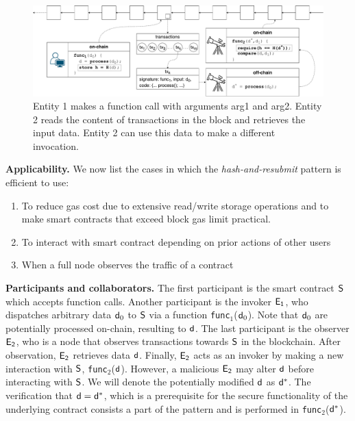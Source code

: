 \begin{figure}[h]
    \begin{center}
        \includegraphics[width=1\textwidth]{figures/observer-tx.pdf}
    \end{center}
    \caption{Entity 1 makes a function call with arguments arg1 and arg2.
    Entity 2 reads the content of transactions in the block and retrieves the
    input data. Entity 2 can use this data to make a different invocation.}
    \label{fig:observe-tx}
\end{figure}

\noindent
\textbf{Applicability.}
We now list the cases in which the \emph{hash-and-resubmit} pattern is
efficient to use:
\begin{enumerate}
    \item To reduce gas cost due to extensive read/write storage operations
        and to make smart contracts that exceed block gas limit practical.
    \item To interact with smart contract depending on prior actions of other
        users
    \item When a full node observes the traffic of a contract
\end{enumerate}

\newcommand{\proc}{\textsf{func}}

\noindent \textbf{Participants and collaborators.} The first participant is the
smart contract $\mathsf{S}$ which accepts function calls. Another participant is
the invoker $\mathsf{E_{1}}$, who dispatches arbitrary data $\mathsf{d}_0$ to $\mathsf{S}$
via a function \texttt{\proc$_1$}($\mathsf{d}_0$). Note that $\mathsf{d}_0$ are
potentially processed on-chain, resulting to $\mathsf{d}$. The last participant is
the observer $\mathsf{E_{2}}$, who is a node that observes transactions towards
$\mathsf{S}$ in the blockchain. After observation, $\mathsf{E_{2}}$ retrieves data
$\mathsf{d}$. Finally, $\mathsf{E_{2}}$ acts as an invoker by making a new interaction
with $\mathsf{S}$, \texttt{\proc$_2$}($\mathsf{d}$). However, a malicious $\mathsf{E_{2}}$
may alter $\mathsf{d}$ before interacting with $\mathsf{S}$. We will denote the
potentially modified $\mathsf{d}$ as $\mathsf{d^*}$. The verification that $\mathsf{d} =
\mathsf{d^*}$, which is a prerequisite for the secure functionality of the underlying
contract consists a part of the pattern and is performed in
\texttt{\proc$_2$}($\mathsf{d^*}$).

